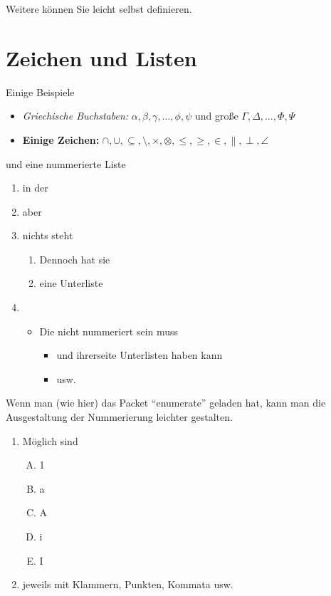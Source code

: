 \documentclass[12pt]{scrartcl}%
\theoremstyle{nonumberplain}
\begin{document}
Weitere können Sie leicht selbst definieren.





\section{Zeichen und Listen}

Einige Beispiele

\begin{itemize}
\item \textit{Griechische Buchstaben:} $\alpha, \beta, \gamma, \dots, \phi,
\psi$ und große $\Gamma, \Delta, \dots, \Phi, \Psi$

\item \textbf{Einige Zeichen:} $\cap, \cup, \subseteq, \setminus,
  \times, \otimes, \le, \ge, \in, \parallel, \perp, \angle$
\end{itemize}
und eine nummerierte Liste
\begin{enumerate}
\item in der 
\item aber
\item nichts steht
  \begin{enumerate}
  \item Dennoch hat sie 
  \item eine Unterliste
  \end{enumerate}
\item 
  \begin{itemize}
  \item Die nicht nummeriert sein muss
    \begin{itemize}
    \item und ihrerseite Unterlisten haben kann
    \item usw.
    \end{itemize}
  \end{itemize}

\end{enumerate}

Wenn man (wie hier) das Packet ``enumerate'' geladen hat, kann man die
Ausgestaltung der Nummerierung leichter gestalten.

\begin{enumerate}[\bfseries (E1)]
\item M\"oglich sind
  \begin{enumerate}[A.)]
  \item 1
  \item a
  \item A
  \item i
  \item I
  \end{enumerate}
  \item jeweils mit Klammern, Punkten, Kommata usw.
\end{enumerate}
\end{document}

